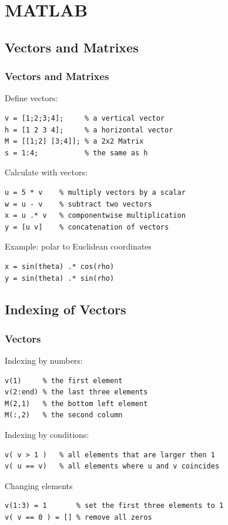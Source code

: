 \section{MATLAB}

\subsection*{Vectors and Matrixes}


\begin{frame}[fragile]
  \frametitle{Vectors and Matrixes}

Define vectors:

\begin{lstlisting}
v = [1;2;3;4];     % a vertical vector
h = [1 2 3 4];     % a horizontal vector
M = [[1;2] [3;4]]; % a 2x2 Matrix
s = 1:4;           % the same as h
\end{lstlisting}

Calculate with vectors:
\begin{lstlisting}
u = 5 * v    % multiply vectors by a scalar
w = u - v    % subtract two vectors
x = u .* v   % componentwise multiplication
y = [u v]    % concatenation of vectors
\end{lstlisting}

Example: polar to Euclidean coordinates
\begin{lstlisting}
x = sin(theta) .* cos(rho)
y = sin(theta) .* sin(rho)
\end{lstlisting}

\end{frame}

\subsection*{Indexing of Vectors}

\begin{frame}[fragile]
  \frametitle{Vectors}


Indexing by numbers:

\begin{lstlisting}
v(1)     % the first element
v(2:end) % the last three elements
M(2,1)   % the bottom left element
M(:,2)   % the second column
\end{lstlisting}

Indexing by conditions:

\begin{lstlisting}
v( v > 1 )   % all elements that are larger then 1
v( u == v)   % all elements where u and v coincides
\end{lstlisting}

Changing elements

\begin{lstlisting}
v(1:3) = 1       % set the first three elements to 1
v( v == 0 ) = [] % remove all zeros
\end{lstlisting}

\end{frame}

